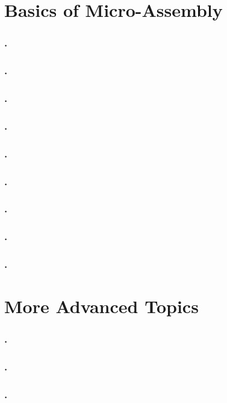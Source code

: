 \documentclass[a4paper,11pt]{book}
\begin{document}
\chapter{Basics of Micro-Assembly}

\subsection{.}
\subsection{.}
\subsection{.}
\subsection{.}
\subsection{.}
\subsection{.}
\subsection{.}
\subsection{.}
\subsection{.}

\chapter{More Advanced Topics}

\subsection{.}
\subsection{.}
\subsection{.}
\end{document}
